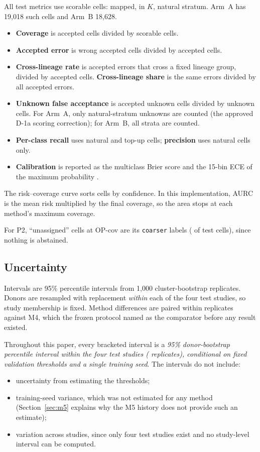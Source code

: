 \documentclass[11pt]{article}
\begin{document}
All test metrics use scorable cells: mapped, in $K$, natural stratum. Arm~A has 19{,}018 such cells and Arm~B 18{,}628.
\begin{itemize}
\item \textbf{Coverage} is accepted cells divided by scorable cells.
\item \textbf{Accepted error} is wrong accepted cells divided by accepted cells.
\item \textbf{Cross-lineage rate} is accepted errors that cross a fixed lineage group, divided by accepted cells. \textbf{Cross-lineage share} is the same errors divided by all accepted errors.
\item \textbf{Unknown false acceptance} is accepted unknown cells divided by unknown cells. For Arm~A, only natural-stratum unknowns are counted (the approved D-1a scoring correction); for Arm~B, all strata are counted.
\item \textbf{Per-class recall} uses natural and top-up cells; \textbf{precision} uses natural cells only.
\item \textbf{Calibration} is reported as the multiclass Brier score and the 15-bin ECE of the maximum probability \citep{guo2017}.
\end{itemize}

\noindent The risk--coverage curve sorts cells by confidence. In this implementation, AURC is the mean risk multiplied by the final coverage, so the area stops at each method's maximum coverage.

For P2, ``unassigned'' cells at OP-cov are its \texttt{coarser} labels ( of test cells), since nothing is abstained.

\subsection{Uncertainty}\label{sec:unc}

Intervals are 95\% percentile intervals from 1{,}000 cluster-bootstrap replicates. Donors are resampled with replacement \emph{within} each of the four test studies, so study membership is fixed. Method differences are paired within replicates against M4, which the frozen protocol named as the comparator before any result existed.

Throughout this paper, every bracketed interval is a \emph{95\% donor-bootstrap percentile interval within the four test studies ( replicates), conditional on fixed validation thresholds and a single training seed}. The intervals do not include:
\begin{itemize}
\item uncertainty from estimating the thresholds;
\item training-seed variance, which was not estimated for any method (Section~\ref{sec:m5} explains why the M5 history does not provide such an estimate);
\item variation across studies, since only four test studies exist and no study-level interval can be computed.
\end{itemize}
\end{document}
